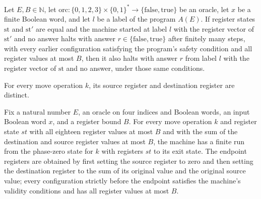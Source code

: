 \begin{lemma}
\label{Complexity.LogProg.SavitchARM.contH}
\leanok
{}
Let $E,B\in\mathbb{N}$, let
$\mathrm{orc}\colon\{0,1,2,3\}\times\{0,1\}^*\to\{\mathrm{false},\mathrm{true}\}$ be an
oracle, let $x$ be a finite Boolean word, and let $l$ be a label of the program $A(E)$.
If register states $\mathrm{st}$ and $\mathrm{st}'$ are equal and the machine started at
label $l$ with the register vector of $\mathrm{st}'$ and no answer halts with answer
$r\in\{\mathrm{false},\mathrm{true}\}$ after finitely many steps, with every earlier
configuration satisfying the program’s safety condition and all register values at most
$B$, then it also halts with answer $r$ from label $l$ with the register vector of
$\mathrm{st}$ and no answer, under those same conditions.
\end{lemma}

\begin{lemma}
\label{Complexity.LogProg.SavitchARM.mv_ne}
\leanok
{}
For every move operation $k$, its source register and destination register are distinct.
\end{lemma}

\begin{theorem}
\label{Complexity.LogProg.SavitchARM.mv_run}
\leanok
{}
Fix a natural number $E$, an oracle on four indices and Boolean words, an input Boolean
word $x$, and a register bound $B$. For every move operation $k$ and register state $st$
with all eighteen register values at most $B$ and with the sum of the destination and
source register values at most $B$, the machine has a finite run from the phase-zero
state for $k$ with registers $st$ to its exit state. The endpoint registers are obtained
by first setting the source register to zero and then setting the destination register
to the sum of its original value and the original source value; every configuration
strictly before the endpoint satisfies the machine's validity conditions and has all
register values at most $B$.
\end{theorem}

